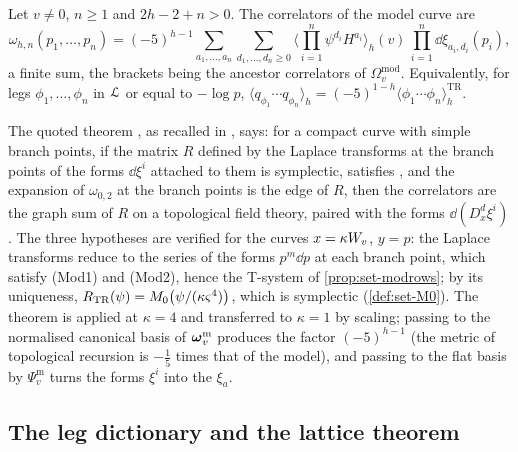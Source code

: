 \begin{thm}
\label{thm:mod-tr}
Let $v\neq0$, $n\geq1$ and $2h-2+n>0$. The correlators of the model curve are
\[
\omega_{h,n}(p_1,\dots,p_n)=(-5)^{h-1}\sum_{a_1,\dots,a_n}\sum_{d_1,\dots,d_n\geq0}\Big\langle\prod_{i=1}^n\psi^{d_i}H^{a_i}\Big\rangle_h(v)\,\prod_{i=1}^n\dd\xi_{a_i,d_i}(p_i),
\]
a finite sum, the brackets being the ancestor correlators of $\Omega^{\mathrm{mod}}_v$. Equivalently, for legs $\phi_1,\dots,\phi_n$ in $\mathcal{L}$ or equal to $-\log p$, $\langle q_{\phi_1}\cdots q_{\phi_n}\rangle_h=(-5)^{1-h}\langle\phi_1\cdots\phi_n\rangle^{\mathrm{TR}}_h$.
\end{thm}

\begin{sketch}
The quoted theorem \cite[Theorem~4.1]{DuninBarkowski:2012bw}, as recalled in \cite[\S2.6]{Dunin-Barkowski:2015caa}, says: for a compact curve with simple branch points, if the matrix $R$ defined by the Laplace transforms at the branch points of the forms $\dd\xi^i$ attached to them is symplectic, satisfies \cite[(2-32)]{Dunin-Barkowski:2015caa}, and the expansion of $\omega_{0,2}$ at the branch points is the edge of $R$, then the correlators are the graph sum of $R$ on a topological field theory, paired with the forms $\dd(D_x^d\xi^i)$. The three hypotheses are verified for the curves $x=\kappa W_{v}$, $y=p$: the Laplace transforms reduce to the series of the forms $p^m\dd p$ at each branch point, which satisfy (Mod1) and (Mod2), hence the T-system of \cref{prop:set-modrows}; by its uniqueness, $R_{\mathrm{TR}}(\psi)=M_{0}\bigl(\psi/(\kappa\varsigma^4)\bigr)$, which is symplectic (\cref{def:set-M0}). The theorem is applied at $\kappa=4$ and transferred to $\kappa=1$ by scaling; passing to the normalised canonical basis of $\boldsymbol{\omega}^{\mathrm m}_v$ produces the factor $(-5)^{h-1}$ (the metric of topological recursion is $-\frac15$ times that of the model), and passing to the flat basis by $\Psi^{\mathrm m}_v$ turns the forms $\xi^i$ into the $\xi_a$.
\end{sketch}

\subsection{The leg dictionary and the lattice theorem}
\label{sec:mod-legs}

